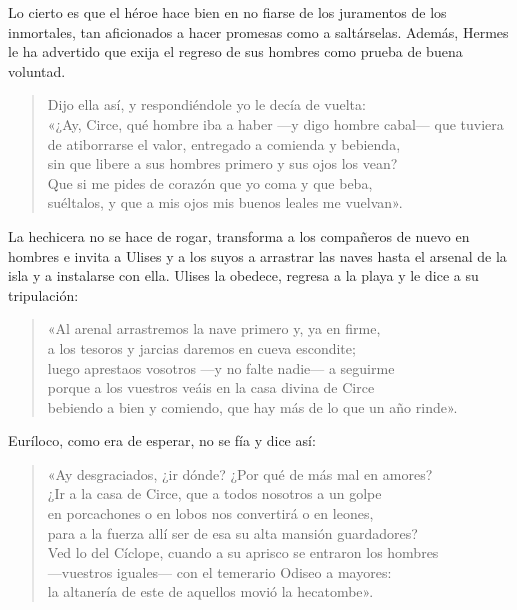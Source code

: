 Lo cierto es que el héroe hace bien en no fiarse de los juramentos de los inmortales, tan aficionados a hacer promesas como a saltárselas. Además, Hermes le ha advertido que exija el regreso de sus hombres como prueba de buena voluntad.

\begin{verse}
Dijo ella así, y respondiéndole yo le decía de vuelta:\\
«¿Ay, Circe, qué hombre iba a haber ---y digo hombre cabal--- que tuviera\\
de atiborrarse el valor, entregado a comienda y bebienda,\\
sin que libere a sus hombres primero y sus ojos los vean?\\
Que si me pides de corazón que yo coma y que beba,\\
suéltalos, y que a mis ojos mis buenos leales me vuelvan».
\end{verse}

La hechicera no se hace de rogar, transforma a los compañeros de nuevo en hombres e invita a Ulises y a los suyos a arrastrar las naves hasta el arsenal de la isla y a instalarse con ella. Ulises la obedece, regresa a la playa y le dice a su tripulación:

\begin{verse}
«Al arenal arrastremos la nave primero y, ya en firme,\\
a los tesoros y jarcias daremos en cueva escondite;\\
luego aprestaos vosotros ---y no falte nadie--- a seguirme\\
porque a los vuestros veáis en la casa divina de Circe\\
bebiendo a bien y comiendo, que hay más de lo que un año rinde».
\end{verse}

Euríloco, como era de esperar, no se fía y dice así:

\begin{verse}
«Ay desgraciados, ¿ir dónde? ¿Por qué de más mal en amores?\\
¿Ir a la casa de Circe, que a todos nosotros a un golpe\\
en porcachones o en lobos nos convertirá o en leones,\\
para a la fuerza allí ser de esa su alta mansión guardadores?\\
Ved lo del Cíclope, cuando a su aprisco se entraron los hombres\\
---vuestros iguales--- con el temerario Odiseo a mayores:\\
la altanería de este de aquellos movió la hecatombe».
\end{verse}

